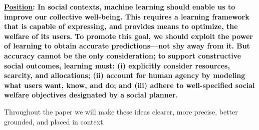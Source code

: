 \textbf{%
\underline{Position}:
In social contexts, machine learning should enable us to improve
our collective well-being.
This requires a learning framework that is capable of expressing,
and provides means to optimize, the welfare of its users.
To promote this goal, we should exploit the power of learning to obtain accurate predictions---not shy away from it.
But accuracy cannot be the only consideration;
to support constructive social outcomes, learning must:
(i) explicitly consider resources, scarcity, and allocations;
(ii) account for human agency by modeling what users want, know, and do;
and (iii) adhere to well-specified social welfare objectives designated by a social planner.
}

Throughout the paper we will make these ideas clearer, more precise,
better grounded, and placed in context.




